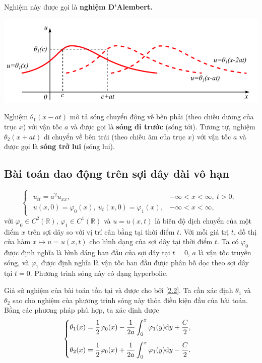 \documentclass[10pt, a4paper]{article}
\begin{document}
	Nghiệm này được gọi là \textbf{\color{red}nghiệm D'Alembert.}
	\begin{center}
		\includegraphics[width=0.7\linewidth]{d'Alembert.png}
	\end{center}
	
	Nghiệm $\theta_1(x-at)$ mô tả sóng chuyển động về bên phải (theo chiều dương của trục $x$) với vận tốc $a$ và được gọi là \textbf{\color{red}sóng đi trước} (sóng tới). Tương tự, nghiệm $\theta_2(x+at)$ di chuyển về bên trái (theo chiều âm của trục $x$) với vận tốc $a$ và được gọi là \textbf{\color{red}sóng trở lui} (sóng lui).
	\subsection{Bài toán dao động trên sợi dây dài vô hạn}
	\vspace{1mm}
	\begin{tcolorbox}[enhanced,colback=blue!5!white,colframe=blue!75!black,sharp corners=all,shadow={0mm}{0mm}{-1.5mm}%
		{fill=blue!75!red,opacity=0.3},title=\textbf{Dạng của bài toán}]
		$$\begin{cases}
			\begin{array}{ll}
				u_{tt}=a^2u_{xx}, & -\infty<x<\infty,~t>0,\\
				u(x,0)=\varphi_0(x),~u_t(x,0)=\varphi_1(x), & -\infty<x<\infty,
			\end{array}
		\end{cases}$$
		với $\varphi_0\in C^2(\mathbb R),\,\varphi_1\in C^1(\mathbb R)$ và $u=u(x,t)$ là biên độ dịch chuyển của một điểm $x$ trên sợi dây so với vị trí cân bằng tại thời điểm $t$.\vskip7pt
		\quad Với mỗi giá trị $t$, đồ thị của hàm $x\mapsto u=u(x,t)$ cho hình dạng của sợi dây tại thời điểm $t$.\vskip7pt
		\quad Ta có $\varphi_0$ được định nghĩa là hình dáng ban đầu của sợi dây tại $t=0$, $a$ là vận tốc truyền sóng, và $\varphi_1$ được định nghĩa là vận tốc ban đầu được phân bố dọc theo sợi dây tại $t=0$.\vskip7pt
		\quad Phương trình sóng này có dạng hyperbolic.
	\end{tcolorbox}
	\vspace{2mm}
	Giả sử nghiệm của bài toán tồn tại và được cho bởi \eqref{2.2}. Ta cần xác định $\theta_1$ và $\theta_2$ sao cho nghiệm của phương trình sóng này thỏa điều kiện đầu của bài toán. Bằng các phương pháp phù hợp, ta xác định được $$\begin{cases}
		\theta_1(x)=\dfrac12\varphi_0(x)-\dfrac{1}{2a}\displaystyle\int_0^x\varphi_1(y)\mathrm dy+\dfrac C2,\\
		\noalign{\vskip9pt}
		\theta_2(x)=\dfrac12\varphi_0(x)+\dfrac{1}{2a}\displaystyle\int_0^x\varphi_1(y)\mathrm dy-\dfrac C2.
	\end{cases}$$
	
\end{document}
